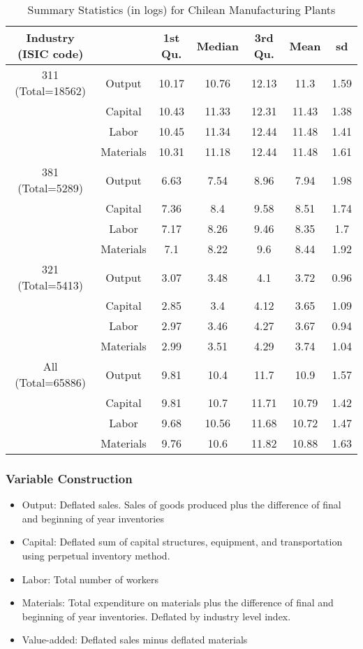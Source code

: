\documentclass[11pt]{article}
\begin{document}
\begin{table}[H]
\centering
\caption{Summary Statistics (in logs) for Chilean Manufacturing Plants}
\begin{tabular}{ccccccc}
  \hline\hline Industry (ISIC code) &   & 1st Qu. & Median & 3rd Qu. & Mean & sd \\ 
  \hline
311 (Total=18562) & Output & 10.17 & 10.76 & 12.13 & 11.3 & 1.59 \\ 
   & Capital & 10.43 & 11.33 & 12.31 & 11.43 & 1.38 \\ 
   & Labor & 10.45 & 11.34 & 12.44 & 11.48 & 1.41 \\ 
   & Materials & 10.31 & 11.18 & 12.44 & 11.48 & 1.61 \\ 
  381 (Total=5289) & Output & 6.63 & 7.54 & 8.96 & 7.94 & 1.98 \\ 
   & Capital & 7.36 & 8.4 & 9.58 & 8.51 & 1.74 \\ 
   & Labor & 7.17 & 8.26 & 9.46 & 8.35 & 1.7 \\ 
   & Materials & 7.1 & 8.22 & 9.6 & 8.44 & 1.92 \\ 
  321 (Total=5413) & Output & 3.07 & 3.48 & 4.1 & 3.72 & 0.96 \\ 
   & Capital & 2.85 & 3.4 & 4.12 & 3.65 & 1.09 \\ 
   & Labor & 2.97 & 3.46 & 4.27 & 3.67 & 0.94 \\ 
   & Materials & 2.99 & 3.51 & 4.29 & 3.74 & 1.04 \\ 
  All (Total=65886) & Output & 9.81 & 10.4 & 11.7 & 10.9 & 1.57 \\ 
   & Capital & 9.81 & 10.7 & 11.71 & 10.79 & 1.42 \\ 
   & Labor & 9.68 & 10.56 & 11.68 & 10.72 & 1.47 \\ 
   & Materials & 9.76 & 10.6 & 11.82 & 10.88 & 1.63 \\ 
   \hline
\end{tabular}
\label{CHLsum}
\end{table}

\subsubsection*{Variable Construction}
\begin{itemize}
	\item Output: Deflated sales. Sales of goods produced plus the difference of final and beginning of year inventories
	\item Capital: Deflated sum of capital structures, equipment, and transportation using perpetual inventory method.
	\item Labor: Total number of workers
	\item Materials: Total expenditure on materials plus the difference of final and beginning of year inventories. Deflated by industry level index.
	\item Value-added: Deflated sales minus deflated materials
\end{itemize}
\end{document}
